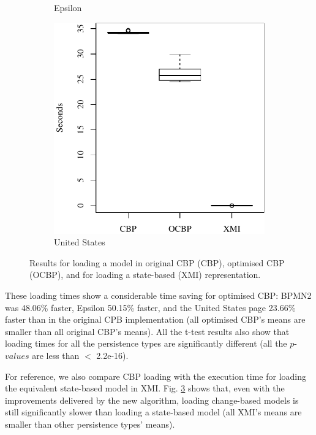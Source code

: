\documentclass{llncs}
\begin{document}
\begin{figure}[ht]
\begin{subfigure}{0.325\textwidth}
         \caption{Epsilon}
         \label{fig:load_time_epsilon}
     \end{subfigure}
     \hfill
     \begin{subfigure}{0.325\textwidth}
         \centering
         \includegraphics[width=\linewidth]{images/load_time_wikipedia}
         \caption{United States}
         \label{fig:load_time_wikipedia}
     \end{subfigure}
     \caption{Results for loading a model in original CBP (CBP), optimised CBP (OCBP), and for loading a state-based (XMI) representation.}
     \label{fig:loadtime}
 \end{figure}
 
These loading times show a considerable time saving for optimised CBP: BPMN2 was 48.06\% faster, Epsilon 50.15\% faster, and the United States page 23.66\% faster than in the original CPB implementation (all optimised CBP's means are  smaller than all original CBP's means). All the t-test results also show that loading times for all the persistence types are significantly different (all the $p$-$values$ are less than  $<$ 2.2e-16). 

For reference, we also compare CBP loading with the execution time for loading the equivalent state-based model in XMI. Fig. \ref{fig:loadtime} shows that, even with the improvements delivered by the new algorithm, loading change-based models is still significantly slower than loading a state-based model (all XMI's means are smaller than other persistence types' means).
\end{document}
